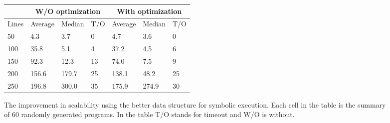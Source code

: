 \documentclass{llncs}
\begin{document}
\begin{figure}[htb]
	
	\begin{minipage}{0.6\textwidth}
\begin{tabular}{|l|l|l|l|l|l|l|}
	\hline
	& \multicolumn{3}{c|}{\small W/O optimization}	& \multicolumn{3}{c|}{\small With optimization} \\
	\hline
	\small Lines & \small Average & \small Median & \small T/O & \small Average & \small Median & \small T/O \\
	\hline
	\hline
	50	&	4.3	    &   3.7	&	0	&	4.7	&	3.6	&	0	\\
	\hline                                                                      
	100	&	35.8	&	5.1&	4	&	37.2	&	4.5	&	6	\\
	\hline                                                                     
	150	&	92.3	&	12.3&	13	&	74.0	&	7.5	&	9	\\
	\hline                                                                     
	200	&	156.6	&	179.7&	25	&	138.1	&	48.2	&	25	\\
	\hline                                                                     
	250	&	196.8	&	300.0&	35	&	175.9	&	274.9	&	30	\\
	\hline
\end{tabular}
	\end{minipage}	
	\begin{minipage}{0.4\textwidth}
	\end{minipage}				

	
	\caption{The improvement in scalability using the better data structure for symbolic execution. Each cell in the table is the summary of 60 randomly generated programs. In the table T/O stands for timeout and W/O is without. } 
	\label{tab:opt2}
\end{figure}
\end{document}
